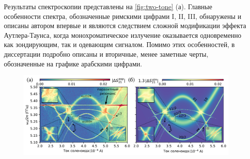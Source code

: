 \documentclass[14pt, a4paper]{extarticle}
\begin{document}
Результаты спектроскопии представлены на \autoref{fig:two-tone} (а). Главные особенности спектра, обозначенные римскими цифрами I, II, III, обнаружены и описаны автором впервые и являются следствием сложной модификации эффекта Аутлера-Таунса, когда монохроматическое излучение оказывается одновременно как зондирующим, так и одевающим сигналом. Помимо этих особенностей, в диссертации подробно описаны и вторичные, менее заметные черты, обозначенные на графике арабскими цифрами.
	\begin{figure}
	
	\centering
	\includegraphics[width=\linewidth]{main_picture}
	

\end{figure}
\end{document}
